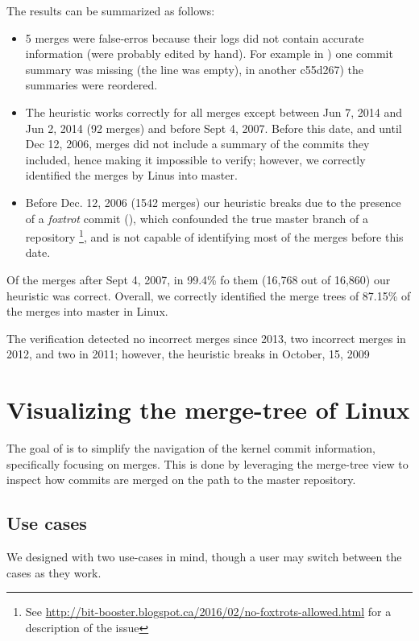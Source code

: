 \documentclass[conference, draftclsnofoot, draft]{IEEEtran}
\begin{document}
The results can be summarized as follows:

\begin{itemize}
\item 5 merges were false-erros because their logs did not contain accurate information (were probably edited by
  hand). For example in ) one commit summary was missing (the line was empty), in another  \mycode
  {c55d267}) the summaries were reordered.
\item The heuristic works correctly for all merges except between Jun 7, 2014 and Jun 2, 2014 (92 merges) and before
  Sept 4, 2007. Before this date, and until Dec 12, 2006, merges did not include a summary of the commits they included, hence making it
  impossible to verify; however, we correctly identified the merges by Linus into master. 
\item Before Dec. 12, 2006 (1542 merges) our heuristic breaks due to the
presence of a \textit{foxtrot} commit (), which confounded the true master branch of a
repository
\footnote{See \url{http://bit-booster.blogspot.ca/2016/02/no-foxtrots-allowed.html} for a description of the issue}, and
is not capable of identifying most of the merges before this date.
\end{itemize}

Of the merges after Sept 4, 2007, in 99.4\% fo them (16,768 out of 16,860)  our heuristic was correct. Overall, we
correctly identified the merge trees of 87.15\% of the merges into master in Linux.
 
The verification detected no incorrect merges since 2013, two incorrect merges in
2012, and two in 2011; however, the heuristic breaks in October, 15, 2009 

\section{Visualizing the merge-tree of Linux}

The goal of \tool is to simplify the navigation of the kernel commit information,
specifically focusing on merges. This is done by leveraging the merge-tree view to
inspect how commits are merged on the path to the master repository.

\subsection{Use cases}

We designed \tool with two use-cases in mind, though a user may switch between the
cases as they work.
\end{document}
